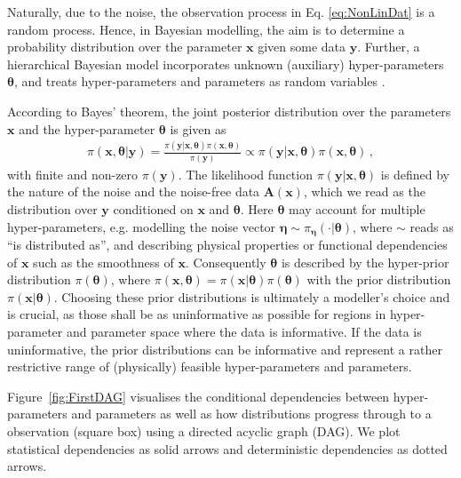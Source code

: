 Naturally, due to the noise, the observation process in Eq. \ref{eq:NonLinDat} is a random process.
Hence, in Bayesian modelling, the aim is to determine a probability distribution over the parameter $\bm{x}$ given some data $\bm{y}$.
Further, a hierarchical Bayesian model incorporates unknown (auxiliary) hyper-parameters $\bm{\theta}$, and treats hyper-parameters and parameters as random variables \cite[Chapter 3]{kaipio2005statinv}.

According to Bayes' theorem, the joint posterior distribution over the parameters $\bm{x}$ and the hyper-parameter $\bm{\theta}$ is given as
\begin{align}
	\pi(\bm{x},\bm{\theta}|\bm{y}) = \frac{ \pi(\bm{y} | \bm{x}, \bm{\theta} ) \pi(\bm{x}, \bm{\theta})}{\pi(\bm{y})} \propto \pi(\bm{y} | \bm{x}, \bm{\theta} ) \pi(\bm{x}, \bm{\theta}) \, ,
\end{align}
with finite and non-zero $\pi(\bm{y})$.
The likelihood function $\pi(\bm{y}|\bm{x},\bm{\theta})$ is defined by the nature of the noise and the noise-free data $\bm{A}(\bm{x})$, which we read as the distribution over $\bm{y}$ conditioned on $\bm{x}$ and $\bm{\theta}$.
Here $\bm{\theta}$ may account for multiple hyper-parameters, e.g. modelling the noise vector $\bm{\eta} \sim \pi_{\bm{\eta}}(\cdot|\bm{\theta})$, where $\sim$ reads as ``is distributed as'', and describing physical properties or functional dependencies of $\bm{x}$ such as the smoothness of $\bm{x}$.
Consequently $\bm{\theta}$ is described by the hyper-prior distribution $\pi(\bm{\theta})$, where $\pi(\bm{x}, \bm{\theta}) = \pi(\bm{x}|\bm{\theta}) \pi(\bm{\theta})$ with the prior distribution $\pi(\bm{x}|\bm{\theta})$.
Choosing these prior distributions is ultimately a modeller's choice and is crucial, as those shall be as uninformative as possible for regions in hyper-parameter and parameter space where the data is informative.
If the data is uninformative, the prior distributions can be informative and represent a rather restrictive range of (physically) feasible hyper-parameters and parameters.

Figure~\ref{fig:FirstDAG} visualises the conditional dependencies between hyper-parameters and parameters as well as how distributions progress through to a observation (square box) using a directed acyclic graph (DAG).
We plot statistical dependencies as solid arrows and deterministic dependencies as dotted arrows.



